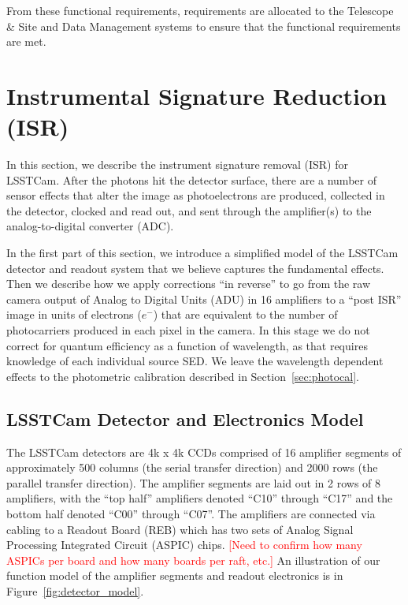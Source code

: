 \documentclass[SE,authoryear,lsstdraft,toc]{lsstdoc}
\newcommand{\etron}{e^{-}}
\newcommand{\todo}[1]{\textcolor{red}{#1}}
\begin{document}
From these functional requirements, requirements are allocated to the Telescope
\& Site  and Data Management  systems to ensure that the
functional requirements are met.

\section{Instrumental Signature Reduction (ISR)}

In this section, we describe the instrument signature removal (ISR) for
LSSTCam.
After the photons hit the detector surface, there are a number of sensor effects that alter the image as photoelectrons are produced, collected in the detector, clocked and read out, and sent through the amplifier(s) to the analog-to-digital converter (ADC).

In the first part of this section, we introduce a simplified model of the LSSTCam detector and readout system that we believe captures the fundamental effects.
Then we describe how we apply corrections ``in reverse'' to go from the raw camera output of Analog to Digital Units (ADU) in 16 amplifiers to a ``post ISR'' image in units of electrons ($\etron$) that are equivalent to the number of photocarriers produced in each pixel in the camera.
In this stage we do not correct for quantum efficiency as a function of wavelength, as that requires knowledge of each individual source SED.
We leave the wavelength dependent effects to the photometric calibration described in Section~\ref{sec:photocal}.

\subsection{LSSTCam Detector and Electronics Model}
\label{sec:detmodel}

The LSSTCam detectors are 4k x 4k CCDs comprised of 16 amplifier segments of approximately 500 columns (the serial transfer direction) and 2000 rows (the parallel transfer direction).
The amplifier segments are laid out in 2 rows of 8 amplifiers, with the ``top half'' amplifiers denoted ``C10'' through ``C17'' and the bottom half denoted ``C00'' through ``C07''.  The amplifiers are connected via cabling to a Readout Board (REB) which has two sets of Analog Signal Processing Integrated Circuit (ASPIC) chips.
\todo{[Need to confirm how many ASPICs per board and how many boards per raft, etc.]}
An illustration of our function model of the amplifier segments and readout electronics is in Figure~\ref{fig:detector_model}.
\end{document}
